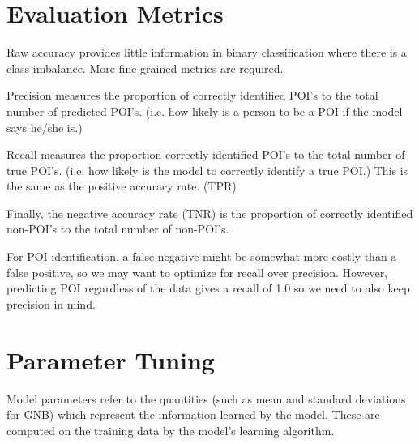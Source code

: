 \documentclass{article}
\begin{document}




\section{Evaluation Metrics}

Raw accuracy provides little information in binary classification where there is a class imbalance. More fine-grained metrics are required.

Precision measures the proportion of correctly identified POI's to the total number of predicted POI's. (i.e. how likely is a person to be a POI if the model says he/she is.)

Recall measures the proportion correctly identified POI's to the total number of true POI's. (i.e. how likely is the model to correctly identify a true POI.) This is the same as the positive accuracy rate. (TPR) 

Finally, the negative accuracy rate (TNR) is the proportion of correctly identified non-POI's to the total number of non-POI's.

For POI identification, a false negative might be somewhat more costly than a false positive, so we may want to optimize for recall over precision. However, predicting POI regardless of the data gives a recall of 1.0 so we need to also keep precision in mind.

\section{Parameter Tuning}

Model parameters refer to the quantities (such as mean and standard deviations for GNB) which represent the information learned by the model. These are computed on the training data by the model's learning algorithm.
\end{document}
